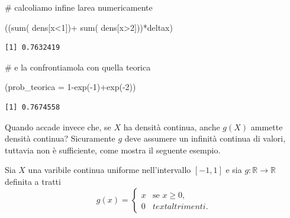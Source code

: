 \documentclass[
  italian,
  letterpaper,
]{book}
\newenvironment{Shaded}{\begin{snugshade}}{\end{snugshade}}
\newcommand{\AttributeTok}[1]{\textcolor[rgb]{0.40,0.45,0.13}{#1}}
\newcommand{\CommentTok}[1]{\textcolor[rgb]{0.37,0.37,0.37}{#1}}
\newcommand{\DecValTok}[1]{\textcolor[rgb]{0.68,0.00,0.00}{#1}}
\newcommand{\FunctionTok}[1]{\textcolor[rgb]{0.28,0.35,0.67}{#1}}
\newcommand{\NormalTok}[1]{\textcolor[rgb]{0.00,0.23,0.31}{#1}}
\newcommand{\SpecialCharTok}[1]{\textcolor[rgb]{0.37,0.37,0.37}{#1}}
\newcommand{\R}{\mathbb{R}}
\theoremstyle{definition}
\theoremstyle{remark}
\begin{document}
\begin{Shaded}
\begin{Highlighting}[]
\CommentTok{\# calcoliamo infine l\textquotesingle{}area numericamente}


\NormalTok{((}\FunctionTok{sum}\NormalTok{( dens[x}\SpecialCharTok{\textless{}}\DecValTok{1}\NormalTok{])}\SpecialCharTok{+} \FunctionTok{sum}\NormalTok{( dens[x}\SpecialCharTok{\textgreater{}}\DecValTok{2}\NormalTok{]))}\SpecialCharTok{*}\NormalTok{deltax)}
\end{Highlighting}
\end{Shaded}

\begin{verbatim}
[1] 0.7632419
\end{verbatim}

\begin{Shaded}
\begin{Highlighting}[]
\CommentTok{\# e la confrontiamola con quella teorica}

\NormalTok{(}\AttributeTok{prob\_teorica =} \DecValTok{1}\SpecialCharTok{{-}}\FunctionTok{exp}\NormalTok{(}\SpecialCharTok{{-}}\DecValTok{1}\NormalTok{)}\SpecialCharTok{+}\FunctionTok{exp}\NormalTok{(}\SpecialCharTok{{-}}\DecValTok{2}\NormalTok{))}
\end{Highlighting}
\end{Shaded}

\begin{verbatim}
[1] 0.7674558
\end{verbatim}

Quando accade invece che, se \(X\) ha densità continua, anche \(g(X)\)
ammette densità continua? Sicuramente \(g\) deve assumere un infinità
continua di valori, tuttavia non è sufficiente, come mostra il seguente
esempio.

Sia \(X\) una varibile continua uniforme nell'intervallo \([-1,1]\) e
sia \(g: \R \to \R\) definita a tratti
\[ g(x) = \begin{cases} x & \text{se $x \ge 0$,}\\
                        0 & text{altrimenti.}\end{cases}\]
\end{document}
